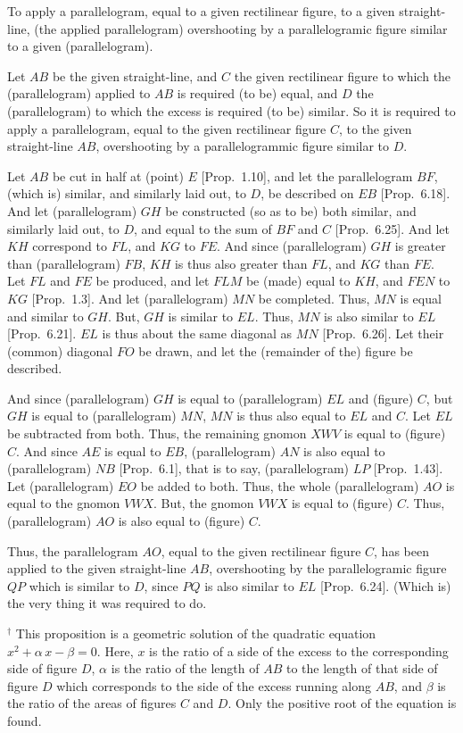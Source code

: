 \begin{Parallel}{}{}
{To apply a parallelogram, equal to a given
rectilinear figure,  to a given
straight-line, (the applied parallelogram) overshooting by a parallelogramic figure similar to a given (parallelogram).

\epsfysize=1.8in
\centerline{}

Let $AB$ be the given straight-line, and $C$ the given rectilinear figure to which the (parallelogram) applied to $AB$ is required (to be) equal, and $D$ the (parallelogram) to which the excess is required (to be) similar. So
it is required to apply a parallelogram, equal to the given rectilinear figure
$C$, to the given straight-line $AB$, overshooting by a parallelogrammic
figure  similar to $D$.

Let $AB$ be cut in half at (point) $E$  [Prop.~1.10], and
let the parallelogram $BF$, (which is) similar, and similarly laid out, to $D$,
be described on $EB$ [Prop.~6.18].
And let (parallelogram) $GH$ be constructed (so as to be) both similar, and similarly laid out, to $D$, and equal to the sum of $BF$ and $C$ [Prop.~6.25]. And let $KH$ correspond to
$FL$, and $KG$ to $FE$. And since (parallelogram) $GH$ is greater than 
(parallelogram) $FB$, $KH$ is thus
also greater than $FL$, and $KG$ than $FE$.  Let $FL$ and $FE$ be produced,
and let $FLM$ be (made) equal to $KH$, and $FEN$ to $KG$  [Prop.~1.3]. 
And let (parallelogram) $MN$ be completed. Thus, $MN$ is equal and
similar  to $GH$. But, $GH$ is similar to $EL$. Thus, $MN$  is also similar to
$EL$ [Prop.~6.21]. $EL$ is thus about the
same diagonal as $MN$ [Prop.~6.26]. 
Let their (common) diagonal $FO$ be drawn, and let the (remainder
of the) figure be described.

And since (parallelogram) $GH$ is equal to (parallelogram) $EL$ and (figure) $C$,
but $GH$ is equal to (parallelogram) $MN$, $MN$ is thus also equal to $EL$ and
$C$. Let $EL$ be subtracted from both. Thus, the remaining gnomon
$XWV$ is equal to (figure) $C$. And since $AE$ is equal to $EB$, (parallelogram)
$AN$ is also equal to (parallelogram) $NB$ [Prop.~6.1], that is to say, (parallelogram) $LP$  [Prop.~1.43]. Let
(parallelogram) $EO$ be added to both. Thus, the whole (parallelogram)
$AO$ is equal to the gnomon $VWX$. But, the gnomon $VWX$ is equal to (figure)
$C$. Thus, (parallelogram) $AO$ is also equal to (figure) $C$.

Thus, the parallelogram $AO$, equal to the given rectilinear figure $C$, has been applied to the given straight-line
$AB$, overshooting by the parallelogramic figure $QP$ which is similar to $D$,
since $PQ$ is also similar to $EL$ [Prop.~6.24].
(Which is) the very thing it was required to do.}
\end{Parallel}
{\footnotesize\noindent$^\dag$ This proposition is a geometric
solution of the quadratic equation $x^2 + \alpha\,x -\beta = 0$. Here,
$x$ is the ratio of a side of the excess to the corresponding side of figure $D$, $\alpha$
is the ratio of the length of $AB$ to the length of that side of figure $D$ which corresponds to the side of the excess running along $AB$, and $\beta$ is the
ratio of the areas of figures $C$ and $D$. Only the positive root of the equation is found.}

